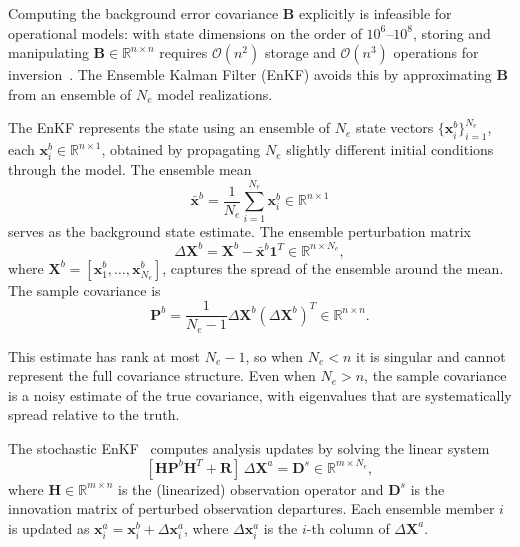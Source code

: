 Computing the background error covariance $\mathbf{B}$ explicitly is infeasible for operational models: with state dimensions on the order of $10^6$--$10^8$, storing and manipulating $\mathbf{B} \in \mathbb{R}^{n \times n}$ requires $\mathcal{O}(n^2)$ storage and $\mathcal{O}(n^3)$ operations for inversion~\citep{evensen2003ensemble}. The Ensemble Kalman Filter (EnKF) avoids this by approximating $\mathbf{B}$ from an ensemble of $N_e$ model realizations.

The EnKF represents the state using an ensemble of $N_e$ state vectors $\{\mathbf{x}_i^b\}_{i=1}^{N_e}$, each $\mathbf{x}_i^b \in \mathbb{R}^{n \times 1}$, obtained by propagating $N_e$ slightly different initial conditions through the model. The ensemble mean
\begin{equation}
\label{eq:ens_mean}
\bar{\mathbf{x}}^b = \frac{1}{N_e} \sum_{i=1}^{N_e} \mathbf{x}_i^b \in \mathbb{R}^{n \times 1}
\end{equation}
serves as the background state estimate. The ensemble perturbation matrix
\begin{equation}
\label{eq:deviation}
\Delta\mathbf{X}^b = \mathbf{X}^b - \bar{\mathbf{x}}^b \mathbf{1}^T \in \mathbb{R}^{n \times N_e},
\end{equation}
where $\mathbf{X}^b = [\mathbf{x}_1^b, \ldots, \mathbf{x}_{N_e}^b]$, captures the spread of the ensemble around the mean. The sample covariance is
\begin{equation}
\label{eq:sample_cov}
\mathbf{P}^b = \frac{1}{N_e - 1} \Delta\mathbf{X}^b (\Delta\mathbf{X}^b)^T \in \mathbb{R}^{n \times n}.
\end{equation}

This estimate has rank at most $N_e - 1$, so when $N_e < n$ it is singular and cannot represent the full covariance structure. Even when $N_e > n$, the sample covariance is a noisy estimate of the true covariance, with eigenvalues that are systematically spread relative to the truth.

The stochastic EnKF~\citep{burgers1998analysis, houtekamer1998data} computes analysis updates by solving the linear system
\begin{equation}
\label{eq:stochastic_enkf}
[\mathbf{H}\mathbf{P}^b\mathbf{H}^T + \mathbf{R}] \, \Delta\mathbf{X}^a = \mathbf{D}^s \in \mathbb{R}^{m \times N_e},
\end{equation}
where $\mathbf{H} \in \mathbb{R}^{m \times n}$ is the (linearized) observation operator and $\mathbf{D}^s$ is the innovation matrix of perturbed observation departures. Each ensemble member $i$ is updated as $\mathbf{x}_i^a = \mathbf{x}_i^b + \Delta\mathbf{x}_i^a$, where $\Delta\mathbf{x}_i^a$ is the $i$-th column of $\Delta\mathbf{X}^a$.


